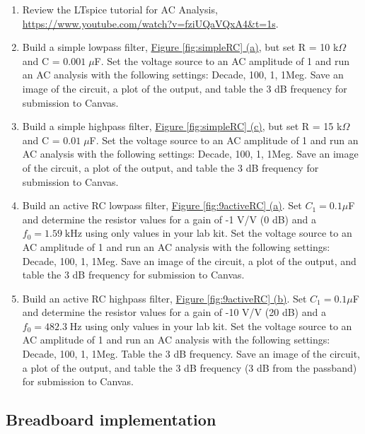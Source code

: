 \begin{enumerate}
\item Review the LTspice tutorial for AC Analysis, \url{https://www.youtube.com/watch?v=fziUQaVQxA4&t=1s}.
	\item Build a simple lowpass filter, \hyperref[fig:simpleRC]{Figure \ref*{fig:simpleRC} (a)}, but set R = 10 k$\Omega$ and C = $0.001\; \mu$F. Set the voltage source to an AC amplitude of 1 and run an AC analysis with the following settings: Decade, 100, 1, 1Meg. Save an image of the circuit, a plot of the output, and table the 3 dB frequency for submission to Canvas. \label{itm:9ssec1itm1}
	\item Build a simple highpass filter, \hyperref[fig:simpleRC]{Figure \ref*{fig:simpleRC} (c)}, but set R = 15 k$\Omega$ and C = $0.01\; \mu$F. Set the voltage source to an AC amplitude of 1 and run an AC analysis with the following settings: Decade, 100, 1, 1Meg. Save an image of the circuit, a plot of the output, and table the 3 dB frequency for submission to Canvas. \label{itm:9ssec1itm2}
	\item Build an active RC lowpass filter, \hyperref[fig:9activeRC]{Figure \ref*{fig:9activeRC} (a)}. Set $C_1 = 0.1\mu$F and determine the resistor values for a gain of -1 V/V (0 dB) and a $f_0 = 1.59\;\mathrm{kHz}$ using only values in your lab kit. Set the voltage source to an AC amplitude of 1 and run an AC analysis with the following settings: Decade, 100, 1, 1Meg. Save an image of the circuit, a plot of the output, and table the 3 dB frequency for submission to Canvas. \label{itm:9ssec1itm3}
	\item Build an active RC highpass filter, \hyperref[fig:9activeRC]{Figure \ref*{fig:9activeRC} (b)}. Set $C_1 = 0.1\mu$F and determine the resistor values for a gain of -10 V/V (20 dB) and a $f_0 = 482.3\;\mathrm{Hz}$ using only values in your lab kit. Set the voltage source to an AC amplitude of 1 and run an AC analysis with the following settings: Decade, 100, 1, 1Meg. Table the 3 dB frequency. Save an image of the circuit, a plot of the output, and table the 3 dB frequency (3 dB from the passband) for submission to Canvas. \label{itm:9ssec1itm4}
\end{enumerate}

\subsection{Breadboard implementation} \label{ssec:9breadboard}


